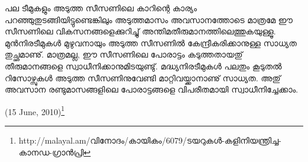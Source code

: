 പല ടീമുകളും അടുത്ത സീസണിലെ കാറിന്റെ കാര്യം പറഞ്ഞുതുടങ്ങിയിട്ടുണ്ടെങ്കിലും അടുത്തമാസം അവസാനത്തോടെ 
മാത്രമേ ഈ സീസണിലെ വികസനങ്ങളെക്കുറിച്ചു് അന്തിമതീരുമാനത്തിലെത്തുകയുള്ളൂ. മുന്‍നിരടീമുകള്‍ മുഴുവനായും 
അടുത്ത സീസണില്‍ കേന്ദ്രീകരിക്കാനുള്ള സാധ്യത തുച്ഛമാണു്. മാത്രമല്ല, ഈ സീസണിലെ പോരാട്ടം കടുത്തതായതു് 
തീരുമാനങ്ങളെ സ്വാധീനിക്കാനുമിടയുണ്ടു്. മദ്ധ്യനിരടീമുകള്‍ പലതും കൂടുതല്‍ റിസോഴ്സുകള്‍ അടുത്ത സീസണിനുവേണ്ടി 
മാറ്റിവയ്ക്കാനാണു് സാധ്യത. അതു് അവസാന രണ്ടുമാസങ്ങളിലെ പോരാട്ടങ്ങളെ വിപരീതമായി സ്വാധീനിച്ചേക്കാം.

\begin{flushright}(15 June, 2010)\footnote{http://malayal.am/വിനോദം/കായികം/6079/ടയറുകള്‍-കളിനിയന്ത്രിച്ച-കാനഡ-ഗ്രാന്‍പ്രി}\end{flushright}

\newpage
